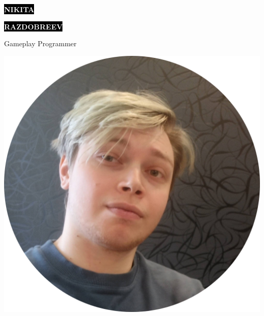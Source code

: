 \documentclass[9pt]{developercv} %
\begin{document}

\begin{minipage}[t]{0.45\textwidth} %
	\vspace{-\baselineskip} %

	\colorbox{black}{{\HUGE\textcolor{white}{\textbf{\MakeUppercase{Nikita}}}}} %

	\colorbox{black}{{\HUGE\textcolor{white}{\textbf{\MakeUppercase{Razdobreev}}}}} %

	\vspace{6pt}

	{\huge Gameplay Programmer} %

	\vspace{6pt}
	\includegraphics[scale=0.05]{photo}
	\vspace{6pt}
\end{minipage}
\end{document}
